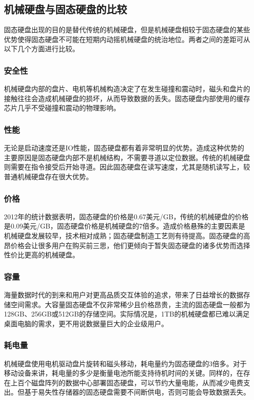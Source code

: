 \subsection{机械硬盘与固态硬盘的比较}
固态硬盘出现的目的是替代传统的机械硬盘，但是机械硬盘相较于固态硬盘的某些优势使得固态硬盘不可能在短期内动摇机械硬盘的统治地位。两者之间的差距可从以下几个方面进行比较。

\subsubsection{安全性}
机械硬盘内部的盘片、电机等机械构造决定了在发生碰撞和震动时，磁头和盘片的接触往往会造成机械硬盘的损坏，从而导致数据的丢失。固态硬盘内部使用的缓存芯片几乎不受碰撞和震动的物理影响。

\subsubsection{性能}
无论是启动速度还是IO性能，固态硬盘都有着非常明显的优势。造成这种优势的主要原因是固态硬盘内部不是机械结构，不需要寻道以定位数据。传统的机械硬盘则需要在指令接受后开始寻道。因此固态硬盘在读写速度，尤其是随机读写上，较普通机械硬盘存在很大优势。

\subsubsection{价格}
2012年的统计数据表明，固态硬盘的价格是0.67美元/GB，传统的机械硬盘的价格是0.09美元/GB，固态硬盘价格是机械硬盘的7倍多。造成价格悬殊的主要因素是机械硬盘发展较早，技术相对成熟；固态硬盘制造工艺则有待提高。固态硬盘的高昂价格会让很多用户在购买前三思，他们更倾向于暂失固态硬盘的诸多优势而选择性价比更高的机械硬盘。

\subsubsection{容量}
海量数据时代的到来和用户对更高品质交互体验的追求，带来了日益增长的数据存储空间需求。大容量固态硬盘不仅非常稀少且价格昂贵，主流的固态硬盘一般都为128GB、256GB或512GB的存储空间。实际情况是，1TB的机械硬盘都已难以满足桌面电脑的需求，更不用说数据量巨大的企业级用户。

\subsubsection{耗电量}
机械硬盘使用电机驱动盘片旋转和磁头移动，耗电量约为固态硬盘的3倍多。对于移动设备来讲，耗电量的多少是衡量电池所能支持待机时间的关键。同样的，在存在上百个磁盘阵列的数据中心部署固态硬盘，可以节约大量电能，从而减少电费支出。但基于易失性存储器的固态硬盘需要不间断供电，否则可能会导致数据丢失。

